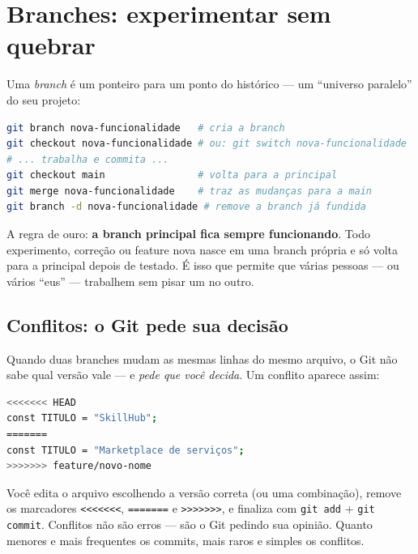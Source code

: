 \section{Branches: experimentar sem quebrar}

Uma \emph{branch} é um ponteiro para um ponto do histórico — um ``universo
paralelo'' do seu projeto:

\begin{lstlisting}[style=livro, language=Bash,
  caption={Criando, trocando e fundindo branches.}, label={list:git-branches}]
git branch nova-funcionalidade   # cria a branch
git checkout nova-funcionalidade # ou: git switch nova-funcionalidade
# ... trabalha e commita ...
git checkout main                # volta para a principal
git merge nova-funcionalidade    # traz as mudanças para a main
git branch -d nova-funcionalidade # remove a branch já fundida
\end{lstlisting}

\begin{caixaconceito}
A regra de ouro: \textbf{a branch principal fica sempre funcionando}. Todo
experimento, correção ou feature nova nasce em uma branch própria e só volta
para a principal depois de testado. É isso que permite que várias pessoas —
ou vários ``eus'' — trabalhem sem pisar um no outro.
\end{caixaconceito}

\subsection{Conflitos: o Git pede sua decisão}

Quando duas branches mudam as mesmas linhas do mesmo arquivo, o Git não sabe
qual versão vale — e \emph{pede que você decida}. Um conflito aparece assim:

\begin{lstlisting}[style=livro, language=Bash,
  caption={Conflito de merge marcado no arquivo.}, label={list:git-conflito}]
<<<<<<< HEAD
const TITULO = "SkillHub";
=======
const TITULO = "Marketplace de serviços";
>>>>>>> feature/novo-nome
\end{lstlisting}

Você edita o arquivo escolhendo a versão correta (ou uma combinação), remove
os marcadores \texttt{<<<<<<<}, \texttt{=======} e \texttt{>>>>>>>}, e
finaliza com \texttt{git add} + \texttt{git commit}. Conflitos não são
erros — são o Git pedindo sua opinião. Quanto menores e mais frequentes os
commits, mais raros e simples os conflitos.

